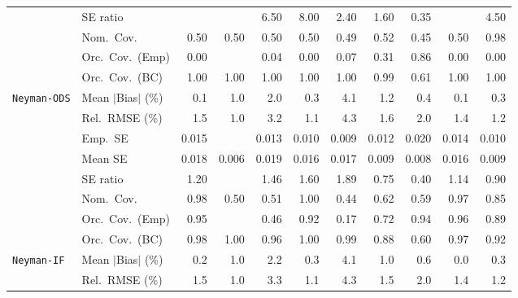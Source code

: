 \begin{landscape}
\begin{longtable}{llrrrrrrrrr}
 & SE ratio &  &  & 6.50 & 8.00 & \cellcolor{rankthree}2.40 & \cellcolor{rankone}1.60 & \cellcolor{ranktwo}0.35 &  & 4.50 \\
 & Nom.\ Cov. & \cellcolor{rankthree}0.50 & \cellcolor{rankthree}0.50 & \cellcolor{rankthree}0.50 & \cellcolor{rankthree}0.50 & 0.49 & \cellcolor{ranktwo}0.52 & 0.45 & \cellcolor{rankthree}0.50 & \cellcolor{rankone}0.98 \\
 & Orc.\ Cov.\ (Emp) & 0.00 &  & 0.04 & 0.00 & \cellcolor{rankthree}0.07 & \cellcolor{ranktwo}0.31 & \cellcolor{rankone}0.86 & 0.00 & 0.00 \\
 & Orc.\ Cov.\ (BC) & \cellcolor{rankone}1.00 & \cellcolor{rankone}1.00 & \cellcolor{rankone}1.00 & \cellcolor{rankone}1.00 & \cellcolor{rankone}1.00 & \cellcolor{rankone}0.99 & \cellcolor{ranktwo}0.61 & \cellcolor{rankone}1.00 & \cellcolor{rankone}1.00 \\
\addlinespace[2pt]
\quad \texttt{Neyman-ODS} & Mean $|$Bias$|$ (\%) & \cellcolor{rankone}0.1 & 1.0 & 2.0 & \cellcolor{ranktwo}0.3 & 4.1 & 1.2 & \cellcolor{rankthree}0.4 & \cellcolor{rankone}0.1 & \cellcolor{ranktwo}0.3 \\
 & Rel.\ RMSE (\%) & 1.5 & \cellcolor{rankone}1.0 & 3.2 & \cellcolor{ranktwo}1.1 & 4.3 & 1.6 & 2.0 & 1.4 & \cellcolor{rankthree}1.2 \\
 & Emp.\ SE & 0.015 &  & 0.013 & 0.010 & 0.009 & 0.012 & 0.020 & 0.014 & 0.010 \\
 & Mean SE & 0.018 & 0.006 & 0.019 & 0.016 & 0.017 & 0.009 & 0.008 & 0.016 & 0.009 \\
 & SE ratio & \cellcolor{rankthree}1.20 &  & 1.46 & 1.60 & 1.89 & 0.75 & 0.40 & \cellcolor{ranktwo}1.14 & \cellcolor{rankone}0.90 \\
 & Nom.\ Cov. & \cellcolor{ranktwo}0.98 & 0.50 & 0.51 & \cellcolor{rankthree}1.00 & 0.44 & 0.62 & 0.59 & \cellcolor{rankone}0.97 & 0.85 \\
 & Orc.\ Cov.\ (Emp) & \cellcolor{rankone}0.95 &  & 0.46 & \cellcolor{rankthree}0.92 & 0.17 & 0.72 & \cellcolor{ranktwo}0.94 & \cellcolor{ranktwo}0.96 & 0.89 \\
 & Orc.\ Cov.\ (BC) & \cellcolor{rankthree}0.98 & 1.00 & \cellcolor{rankone}0.96 & 1.00 & 0.99 & 0.88 & 0.60 & \cellcolor{ranktwo}0.97 & \cellcolor{rankthree}0.92 \\
\addlinespace[2pt]
\quad \texttt{Neyman-IF} & Mean $|$Bias$|$ (\%) & \cellcolor{ranktwo}0.2 & 1.0 & 2.2 & \cellcolor{rankthree}0.3 & 4.1 & 1.0 & 0.6 & \cellcolor{rankone}0.0 & \cellcolor{rankthree}0.3 \\
 & Rel.\ RMSE (\%) & 1.5 & \cellcolor{rankone}1.0 & 3.3 & \cellcolor{ranktwo}1.1 & 4.3 & 1.5 & 2.0 & 1.4 & \cellcolor{rankthree}1.2 \\

\end{longtable}
\end{landscape}

